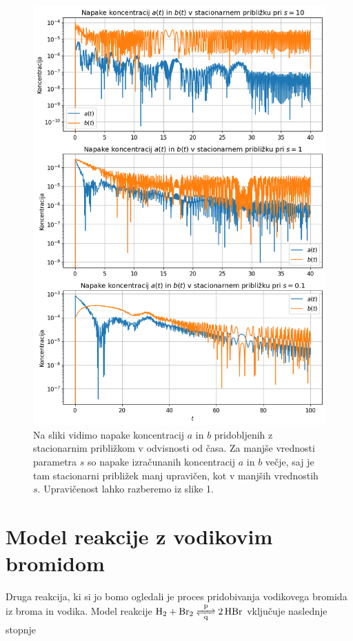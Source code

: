 \documentclass[slovene,11pt,a4paper]{article}
\begin{document}
\begin{figure}[h!]
\centering
\includegraphics[width=15cm]{binarna3.png}
\caption{Na sliki vidimo napake koncentracij $a$ in $b$ pridobljenih z stacionarnim približkom v odvisnosti od časa. Za manjše vrednosti parametra $s$ so napake izračunanih koncentracij $a$ in $b$ večje, saj je tam stacionarni približek manj upravičen, kot v manjših vrednostih $s$. Upravičenost lahko razberemo iz slike 1.}
\end{figure}

\newpage

\section{Model reakcije z vodikovim bromidom}

Druga reakcija, ki si jo bomo ogledali je proces pridobivanja vodikovega bromida iz broma in vodika. Model reakcije $\ce{H2 + Br2 <=>[p][q] 2HBr}$ vključuje naslednje stopnje
\end{document}
